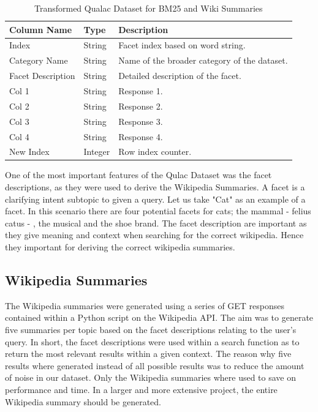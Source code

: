 \documentclass[11pt]{article}
\begin{document}
\begin{table}[ht]
  \centering
  \caption{Transformed Qualac Dataset for BM25 and Wiki Summaries}
  \label{tab:dataset-columns}
  \begin{tabularx}{\columnwidth}{@{} l l X @{}}
    \textbf{Column Name}  & \textbf{Type}    & \textbf{Description}                        \\ 
    \hline
    Index                 & String           & Facet index based on word string.            \\ 
    Category Name         & String           & Name of the broader category of the dataset. \\ 
    Facet Description     & String           & Detailed description of the facet.           \\ 
    Col 1                 & String           & Response 1.                                  \\ 
    Col 2                 & String           & Response 2.                                  \\ 
    Col 3                 & String           & Response 3.                                  \\ 
    Col 4                 & String           & Response 4.                                  \\ 
    New Index             & Integer          & Row index counter.                           \\ 
  \end{tabularx}
\end{table}

One of the most important features of the Qulac Dataset was the facet descriptions, as they were used to derive the Wikipedia Summaries. A facet is a clarifying intent subtopic to given a query. Let us take "Cat" as an example of a facet. In this scenario there are four potential facets for cats; the mammal - felius catus - , the musical  and the shoe brand. The facet description are important as they give meaning and context when searching for the correct wikipedia. Hence they important for deriving the correct wikipedia summaries. 

\subsection{Wikipedia Summaries}
The Wikipedia summaries were generated using a series of GET responses contained within a Python script on the Wikipedia API. The aim was to generate five summaries per topic based on the facet descriptions \textendash{} relating to the user's query. In short, the facet descriptions were used within a search function as to return the most relevant results within a given context. The reason why five results where generated instead of all possible results was to reduce the amount of noise in our dataset. Only the Wikipedia summaries where used to save on performance and time. In a larger and more extensive project, the entire Wikipedia summary should be generated. 
\end{document}
